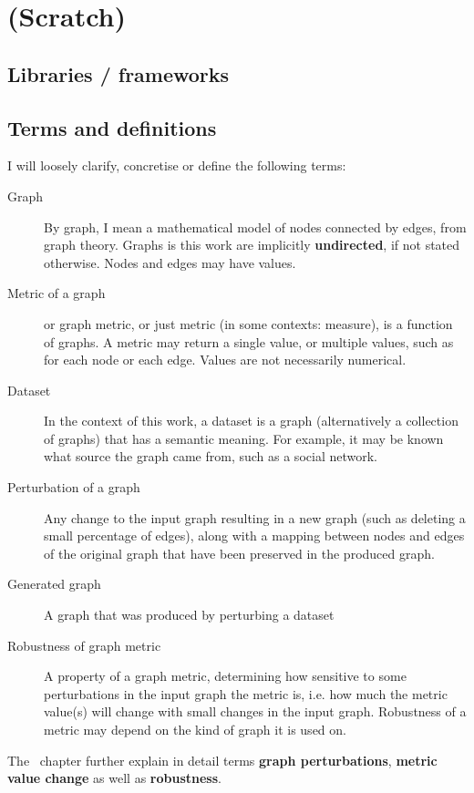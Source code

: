 \chapter{(Scratch)}

\section{Libraries / frameworks}


\section{Terms and definitions}

I will loosely clarify, concretise or define the following terms:

\begin{description}
    \item[Graph]
    By graph, I mean a mathematical model of nodes connected by edges, from graph theory.
    Graphs is this work are implicitly \textbf{undirected}, if not stated otherwise.
    Nodes and edges may have values.

    \item[Metric of a graph]
    or graph metric, or just metric (in some contexts: measure), is a function of graphs.
    A metric may return a single value, or multiple values, such as for each node or each edge.
    Values are not necessarily numerical.

    \item [Dataset]
    In the context of this work, a dataset is a graph (alternatively a collection of graphs) that has a semantic meaning.
    For example, it may be known what source the graph came from, such as a social network.

    \item[Perturbation of a graph]
    Any change to the input graph resulting in a new graph (such as deleting a small percentage of edges), along with a mapping between nodes and edges of the original graph that have been preserved in the produced graph.

    \item[Generated graph]
    A graph that was produced by perturbing a dataset

    \item[Robustness of graph metric]
    A property of a graph metric, determining how sensitive to some perturbations in the input graph the metric is, i.e. how much the metric value(s) will change with small changes in the input graph.
    Robustness of a metric may depend on the kind of graph it is used on.
\end{description}

The~ chapter further explain in detail terms \textbf{graph perturbations}, \textbf{metric value change} as well as \textbf{robustness}.

